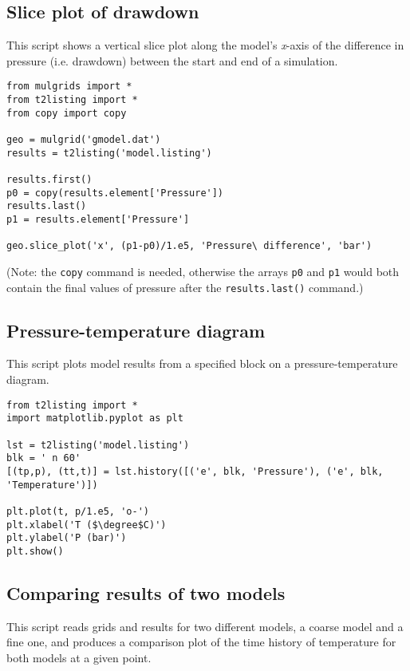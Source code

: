 \subsection{Slice plot of drawdown}

This script shows a vertical slice plot along the model's \emph{x}-axis of the difference in pressure (i.e. drawdown) between the start and end of a simulation.

\begin{lstlisting}
from mulgrids import *
from t2listing import *
from copy import copy

geo = mulgrid('gmodel.dat')
results = t2listing('model.listing')

results.first()
p0 = copy(results.element['Pressure'])
results.last()
p1 = results.element['Pressure']

geo.slice_plot('x', (p1-p0)/1.e5, 'Pressure\ difference', 'bar')
\end{lstlisting}

(Note: the \texttt{copy} command is needed, otherwise the arrays \texttt{p0} and \texttt{p1} would both contain the final values of pressure after the \texttt{results.last()} command.)

\subsection{Pressure-temperature diagram}

This script plots model results from a specified block on a pressure-temperature diagram.

\begin{lstlisting}
from t2listing import *
import matplotlib.pyplot as plt

lst = t2listing('model.listing')
blk = ' n 60'
[(tp,p), (tt,t)] = lst.history([('e', blk, 'Pressure'), ('e', blk, 'Temperature')])

plt.plot(t, p/1.e5, 'o-')
plt.xlabel('T ($\degree$C)')
plt.ylabel('P (bar)')
plt.show()
\end{lstlisting}

\subsection{Comparing results of two models}
\label{comparison_example}

This script reads grids and results for two different models, a coarse model and a fine one, and produces a comparison plot of the time history of temperature for both models at a given point.

